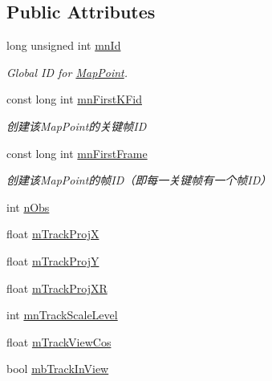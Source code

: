 \subsection*{Public Attributes}
\begin{DoxyCompactItemize}
\item 
long unsigned int \mbox{\hyperlink{class_o_r_b___s_l_a_m2_1_1_map_point_afba2eb4d8400a0c822ee991ba445d9be}{mn\+Id}}
\begin{DoxyCompactList}\small\item\em Global ID for \mbox{\hyperlink{class_o_r_b___s_l_a_m2_1_1_map_point}{Map\+Point}}. \end{DoxyCompactList}\item 
const long int \mbox{\hyperlink{class_o_r_b___s_l_a_m2_1_1_map_point_ad3f9757b633aac7c026a0e5330e4b10c}{mn\+First\+K\+Fid}}
\begin{DoxyCompactList}\small\item\em 创建该\+Map\+Point的关键帧\+ID \end{DoxyCompactList}\item 
const long int \mbox{\hyperlink{class_o_r_b___s_l_a_m2_1_1_map_point_a68929d6ead18e19745ec358f2ef8776d}{mn\+First\+Frame}}
\begin{DoxyCompactList}\small\item\em 创建该\+Map\+Point的帧\+I\+D（即每一关键帧有一个帧\+I\+D） \end{DoxyCompactList}\item 
int \mbox{\hyperlink{class_o_r_b___s_l_a_m2_1_1_map_point_a2653a4c69121627fcc5ae812b1809a28}{n\+Obs}}
\item 
float \mbox{\hyperlink{class_o_r_b___s_l_a_m2_1_1_map_point_a7d735552c42630c00bca4c2094fbbbf3}{m\+Track\+ProjX}}
\item 
float \mbox{\hyperlink{class_o_r_b___s_l_a_m2_1_1_map_point_a5ab59610931a5c2e14f502e8233571e4}{m\+Track\+ProjY}}
\item 
float \mbox{\hyperlink{class_o_r_b___s_l_a_m2_1_1_map_point_a4f0a0671a3587e2aac0708eed07c5170}{m\+Track\+Proj\+XR}}
\item 
int \mbox{\hyperlink{class_o_r_b___s_l_a_m2_1_1_map_point_aac515bf003cea5f99737d13475c46816}{mn\+Track\+Scale\+Level}}
\item 
float \mbox{\hyperlink{class_o_r_b___s_l_a_m2_1_1_map_point_a728107bc670ba47d79bad5ba288256d6}{m\+Track\+View\+Cos}}
\item 
bool \mbox{\hyperlink{class_o_r_b___s_l_a_m2_1_1_map_point_a0187350fa3fddd0bf89ccf354acb4766}{mb\+Track\+In\+View}}
\item 

\end{DoxyCompactItemize}
